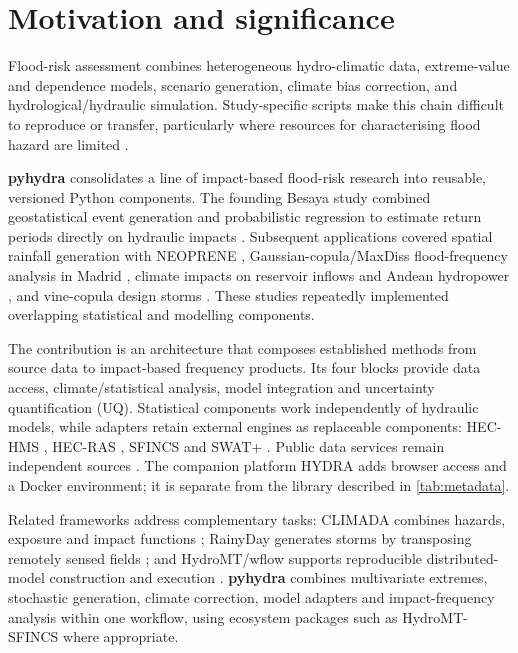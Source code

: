 \documentclass[preprint,12pt,a4paper]{elsarticle}
\newcommand{\pyhydra}{\textbf{pyhydra}}
\begin{document}
\section{Motivation and significance}
\label{sec:motivation}

Flood-risk assessment combines heterogeneous hydro-climatic data,
extreme-value and dependence models, scenario generation, climate bias
correction, and hydrological/hydraulic simulation. Study-specific scripts
make this chain difficult to reproduce or transfer, particularly where
resources for characterising flood hazard are limited
\citep{dibaldassarre2010}.

\pyhydra{} consolidates a line of impact-based flood-risk research into
reusable, versioned Python components. The founding Besaya study combined
geostatistical event generation and probabilistic regression to estimate
return periods directly on hydraulic impacts \citep{navas2018besaya}.
Subsequent applications covered spatial rainfall generation with NEOPRENE
\citep{diezsierra2023neoprene}, Gaussian-copula/MaxDiss flood-frequency
analysis in Madrid \citep{navas2024calle30}, climate impacts on reservoir
inflows \citep{navas2025simpce} and Andean hydropower
\citep{deljesus2020andinos}, and vine-copula design storms
\citep{urrea2026vine}. These studies repeatedly implemented overlapping
statistical and modelling components.

The contribution is an architecture that composes established methods from
source data to impact-based frequency products. Its four blocks provide
data access, climate/statistical analysis, model integration and uncertainty
quantification (UQ). Statistical components work independently of hydraulic
models, while adapters retain external engines as replaceable components:
HEC-HMS \citep{scharffenberg2016hechms}, HEC-RAS
\citep{brunner2016hecras}, SFINCS \citep{leijnse2021sfincs} and SWAT+
\citep{gassman2007swat}. Public data services remain independent sources
\citep{hersbach2020era5,huffman2020gpm,alfieri2013glofas,poggio2021soilgrids}.
The companion platform HYDRA adds browser access and a Docker environment;
it is separate from the library described in \cref{tab:metadata}.

Related frameworks address complementary tasks: CLIMADA combines hazards,
exposure and impact functions \citep{aznar2019climada}; RainyDay generates
storms by transposing remotely sensed fields \citep{wright2017rainyday};
and HydroMT/wflow supports reproducible distributed-model construction and
execution \citep{eilander2023hydromt,vanverseveld2024wflow}. \pyhydra{}
combines multivariate extremes, stochastic generation, climate correction,
model adapters and impact-frequency analysis within one workflow, using
ecosystem packages such as HydroMT-SFINCS where appropriate.
\end{document}
